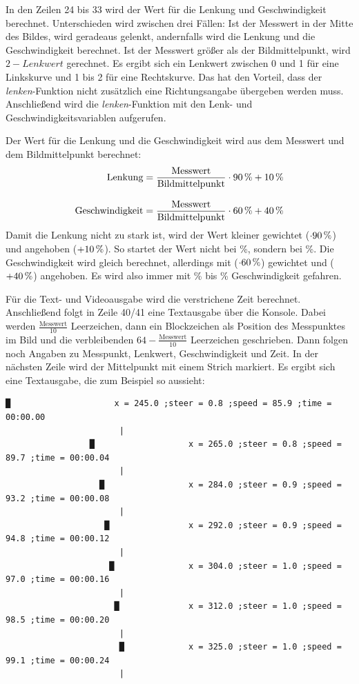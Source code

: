 \documentclass[a4paper, 12pt]{scrartcl}
\begin{document}
In den Zeilen 24 bis 33 wird der Wert für die Lenkung und Geschwindigkeit berechnet. Unterschieden wird zwischen drei Fällen: Ist der Messwert in der Mitte des Bildes, wird geradeaus gelenkt, andernfalls wird die Lenkung und die Geschwindigkeit berechnet. Ist der Messwert größer als der Bildmittelpunkt, wird $2-\textit{Lenkwert}$ gerechnet. Es ergibt sich ein Lenkwert zwischen 0 und 1 für eine Linkskurve und 1 bis 2 für eine Rechtskurve. Das hat den Vorteil, dass der \textit{lenken}-Funktion nicht zusätzlich eine Richtungsangabe übergeben werden muss. Anschließend wird die \textit{lenken}-Funktion mit den Lenk- und Geschwindigkeitsvariablen aufgerufen.

Der Wert für die Lenkung und die Geschwindigkeit wird aus dem Messwert und dem Bildmittelpunkt berechnet:
\begin{align}
\text{Lenkung}&=\frac{\text{Messwert}}{\text{Bildmittelpunkt}}\cdot\unit[90]{\%}+\unit[10]{\%}\\[2ex]
\text{Geschwindigkeit}&=\frac{\text{Messwert}}{\text{Bildmittelpunkt}}\cdot\unit[60]{\%} + \unit[40]{\%}
\end{align}
Damit die Lenkung nicht zu stark ist, wird der Wert kleiner gewichtet ($\cdot\unit[90]{\%}$) und angehoben ($+\unit[10]{\%}$). So startet der Wert nicht bei \unit[0]{\%}, sondern bei \unit[10]{\%}.
Die Geschwindigkeit wird gleich berechnet, allerdings mit ($\cdot\unit[60]{\%}$) gewichtet und ($+\unit[40]{\%}$) angehoben. Es wird also immer mit \unit[40]{\%} bis \unit[100]{\%} Geschwindigkeit gefahren.

Für die Text- und Videoausgabe wird die verstrichene Zeit berechnet. Anschließend folgt in Zeile 40/41 eine Textausgabe über die Konsole. Dabei werden $\frac{\text{Messwert}}{10}$ Leerzeichen, dann ein Blockzeichen als Position des Messpunktes im Bild und die verbleibenden $64-\frac{\text{Messwert}}{10}$ Leerzeichen geschrieben. Dann folgen noch Angaben zu Messpunkt, Lenkwert, Geschwindigkeit und Zeit. In der nächsten Zeile wird der Mittelpunkt mit einem Strich markiert. Es ergibt sich eine Textausgabe, die zum Beispiel so aussieht:

\begin{lstlisting}[numbers=none]
               █                     x = 245.0 ;steer = 0.8 ;speed = 85.9 ;time = 00:00.00
                       |
                 █                   x = 265.0 ;steer = 0.8 ;speed = 89.7 ;time = 00:00.04
                       |
                   █                 x = 284.0 ;steer = 0.9 ;speed = 93.2 ;time = 00:00.08
                       |
                    █                x = 292.0 ;steer = 0.9 ;speed = 94.8 ;time = 00:00.12
                       |
                     █               x = 304.0 ;steer = 1.0 ;speed = 97.0 ;time = 00:00.16
                       |
                      █              x = 312.0 ;steer = 1.0 ;speed = 98.5 ;time = 00:00.20
                       |
                       █             x = 325.0 ;steer = 1.0 ;speed = 99.1 ;time = 00:00.24
                       |
\end{lstlisting}
\vspace{-4ex}
\end{document}
